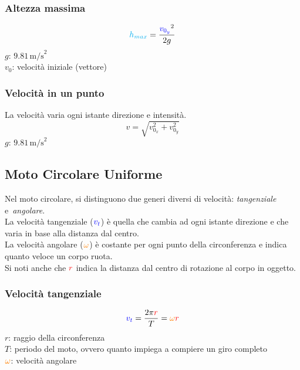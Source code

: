 \subsubsection{Altezza massima}
\begin{equation*}
\mathcolor{cyan}{h_{max}} = \frac{\mathcolor{blue}{v_{0_y}}^2}{2g}
\end{equation*}
\hyperref[tab:g]{$g$}: $9.81\,\text{m/s}^2$\\
$v_0$: velocità iniziale (vettore)

\subsubsection{Velocità in un punto}
La velocità varia ogni istante direzione e intensità.
\begin{equation*}
v = \sqrt{v_{0_x}^2+v_{0_y}^2}
\end{equation*}
\hyperref[tab:g]{$g$}: $9.81\,\text{m/s}^2$

\subsection{Moto Circolare Uniforme}\label{subsec:mcu}
\begin{center}
\end{center}
Nel moto circolare, si distinguono due generi diversi di velocità: \emph{tangenziale} e\
\emph{angolare}.\\[\baselineskip]
La velocità tangenziale ($\mathcolor{blue}{v_t}$) è quella che cambia ad ogni istante direzione e che varia in base alla distanza dal centro.\\
La velocità angolare ($\mathcolor{orange}{\omega}$) è costante per ogni punto della circonferenza e 
indica quanto veloce un corpo ruota.\\[\baselineskip]
Si noti anche che $\mathcolor{red}{r}$ indica la distanza dal centro di rotazione al corpo in oggetto.
\\[\baselineskip]
\subsubsection{Velocità tangenziale}
\begin{equation*}
\mathcolor{blue}{v_t} = \frac{2\pi\mathcolor{red}{r}}{T} =
\mathcolor{orange}{\omega}\mathcolor{red}{r}
\end{equation*}
$r$: raggio della circonferenza\\
$T$: periodo del moto, ovvero quanto impiega a compiere un giro completo\\
$\mathcolor{orange}{\omega}$: velocità angolare

